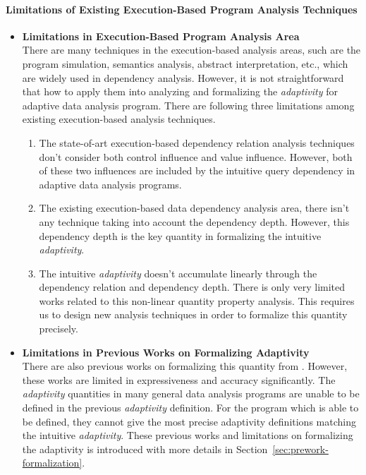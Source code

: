 \paragraph{Limitations of Existing Execution-Based Program Analysis Techniques}

\begin{itemize}
   \item \textbf{Limitations in Execution-Based Program Analysis Area}
   \\
There are many techniques in the execution-based analysis areas, such are the program simulation, 
semantics analysis, abstract interpretation, etc., which are widely used in dependency analysis. 
However, it is not straightforward that how to apply them into analyzing and formalizing the \emph{adaptivity}
for adaptive data analysis program.
There are following three limitations among existing execution-based analysis techniques.
\begin{enumerate}
\item The state-of-art execution-based dependency relation analysis techniques don't
consider both control influence and value influence. However, both of these
two influences are included by the intuitive query dependency 
in adaptive data analysis programs.
\item The existing execution-based data dependency analysis area, there isn't any technique taking into account
the dependency depth. However, this dependency depth is the key quantity in formalizing the intuitive \emph{adaptivity}.
\item The intuitive \emph{adaptivity} doesn't accumulate linearly through the dependency relation and 
dependency depth. There is only very limited works related to this non-linear quantity property analysis.
This requires us to design new analysis techniques in order to formalize this quantity precisely.
\end{enumerate}
\item  \textbf{Limitations in Previous Works on Formalizing Adaptivity} 
\\
There are also previous works on formalizing this quantity from . However, these works
are limited in expressiveness and accuracy significantly.
The \emph{adaptivity} quantities in many general data analysis programs are unable to be defined in the previous \emph{adaptivity} definition.
For the program which is able to be defined,
they cannot give the most precise adaptivity definitions matching the intuitive \emph{adaptivity}.
These previous works and limitations on formalizing the adaptivity is introduced with more details in Section~\ref{sec:prework-formalization}.
\end{itemize}
%

